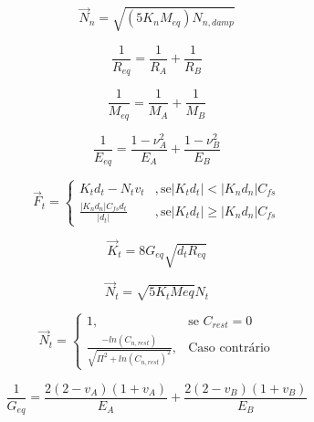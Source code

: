 		\begin{equation}\label{eq2.17}
				\vec{N}_{n} = \sqrt{(5K_{n}M_{eq})N_{n,damp}}
		\end{equation}
		
		\begin{equation}
				\frac{1}{R_{eq}} = \frac{1}{R_{A}} + \frac{1}{R_{B}}
		\end{equation}
		
		\begin{equation}
				\frac{1}{M_{eq}} = \frac{1}{M_{A}} + \frac{1}{M_{B}}
		\end{equation}
		
		\begin{equation}
				\frac{1}{E_{eq}} = \frac{1 - \nu^{2}_{A}}{E_{A}} + \frac{1 - \nu^{2}_{B}}{E_{B}}
		\end{equation}
		
		\begin{equation}
				\vec{F}_{t} = 
				\begin{cases}
						K_{t} d_{t} - N_{t}v_{t} &, \text{se} \left| K_{t} d_{t} \right| < \left| K_{n} d_{n} \right| C_{fs} \\
						\frac{ \left| K_{n} d_{n} \right| C_{fs} d_{t} }{ \left| d_{t} \right| } &, \text{se} \left| K_{t} d_{t} \right| \geq \left| K_{n} d_{n} \right| C_{fs}
				\end{cases}
		\end{equation}
		
		\begin{equation}
				\vec{K}_{t} = 8 G_{eq} \sqrt{d_t R_{eq}}
		\end{equation}
		
		\begin{equation}
				\vec{N}_{t} = \sqrt{5 K_t Meq} N_t
		\end{equation}
		
		\begin{equation}
				\vec{N}_{t} = 
				\begin{cases}
						1, & \text{se } C_{rest} = 0 \\
						\frac{ -ln(C_{n,rest}) }{ \sqrt{\Pi^2 + ln(C_{n,rest})^2 } }, & \text{Caso contrário}
				\end{cases}
		\end{equation}
		
		\begin{equation}
			\frac{1}{G_{eq}} = \frac{2(2 - v_A)(1 + v_A)}{E_A} + \frac{2(2 - v_B)(1 + v_B)}{E_B}
		\end{equation}
		

